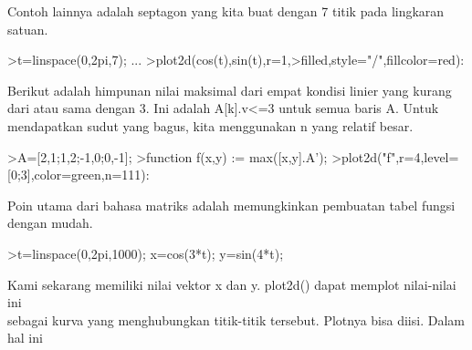 \documentclass[a4paper,10pt]{article}
\begin{document}
\begin{eulernotebook}
\begin{eulercomment}
\begin{eulercomment}
\begin{eulercomment}
\begin{eulercomment}
\begin{eulercomment}
\begin{eulercomment}
\begin{eulercomment}
\begin{eulercomment}
\begin{eulercomment}
\begin{eulercomment}
\begin{eulercomment}
\begin{eulercomment}
\begin{eulercomment}
\begin{eulercomment}
\begin{eulercomment}
\begin{eulercomment}
\begin{eulercomment}
\begin{eulercomment}
\begin{eulercomment}
\begin{eulercomment}
\begin{eulercomment}
\begin{eulercomment}
\begin{eulercomment}
\begin{eulercomment}
\begin{eulercomment}
\begin{eulercomment}
\begin{eulercomment}
\begin{eulercomment}
\begin{eulercomment}
\begin{eulercomment}
\begin{eulercomment}
\begin{eulercomment}
\begin{eulercomment}
\begin{eulercomment}
\begin{eulercomment}
\begin{eulercomment}
\begin{eulercomment}
Contoh lainnya adalah septagon yang kita buat dengan 7 titik pada
lingkaran satuan.
\end{eulercomment}
\begin{eulerprompt}
>t=linspace(0,2pi,7);  ...
>plot2d(cos(t),sin(t),r=1,>filled,style="/",fillcolor=red):
\end{eulerprompt}
\begin{eulercomment}
Berikut adalah himpunan nilai maksimal dari empat kondisi linier yang
kurang dari atau sama dengan 3. Ini adalah A[k].v\textless{}=3 untuk semua baris
A. Untuk mendapatkan sudut yang bagus, kita menggunakan n yang relatif
besar.
\end{eulercomment}
\begin{eulerprompt}
>A=[2,1;1,2;-1,0;0,-1];
>function f(x,y) := max([x,y].A');
>plot2d("f",r=4,level=[0;3],color=green,n=111):
\end{eulerprompt}
\begin{eulercomment}
Poin utama dari bahasa matriks adalah memungkinkan pembuatan tabel
fungsi dengan mudah.
\end{eulercomment}
\begin{eulerprompt}
>t=linspace(0,2pi,1000); x=cos(3*t); y=sin(4*t);
\end{eulerprompt}
\begin{eulercomment}
Kami sekarang memiliki nilai vektor x dan y. plot2d() dapat memplot
nilai-nilai ini\\
sebagai kurva yang menghubungkan titik-titik tersebut. Plotnya bisa
diisi. Dalam hal ini\\

\end{eulercomment}
\end{eulercomment}
\end{eulercomment}
\end{eulercomment}
\end{eulercomment}
\end{eulercomment}
\end{eulercomment}
\end{eulercomment}
\end{eulercomment}
\end{eulercomment}
\end{eulercomment}
\end{eulercomment}
\end{eulercomment}
\end{eulercomment}
\end{eulercomment}
\end{eulercomment}
\end{eulercomment}
\end{eulercomment}
\end{eulercomment}
\end{eulercomment}
\end{eulercomment}
\end{eulercomment}
\end{eulercomment}
\end{eulercomment}
\end{eulercomment}
\end{eulercomment}
\end{eulercomment}
\end{eulercomment}
\end{eulercomment}
\end{eulercomment}
\end{eulercomment}
\end{eulercomment}
\end{eulercomment}
\end{eulercomment}
\end{eulercomment}
\end{eulercomment}
\end{eulercomment}
\end{eulernotebook}
\end{document}
